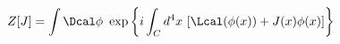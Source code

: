 \begin{equation}
  Z[J] = \int \Dcal \phi~\exp \left\{ i \int_C d^4x~[\Lcal (\phi (x))
  + J(x)\phi (x)] \right\}
\label{ZFT}
\end{equation}

